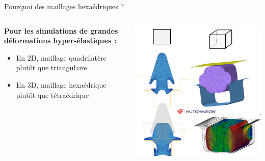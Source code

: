 \begin{frame}{Pourquoi des maillages hexaédriques ?}
    \begin{columns}[T] %
        \begin{column}{.4\textwidth}
            \textbf{Pour les simulations de grandes déformations hyper-élastiques :}

            \begin{itemize}
                \item En 2D, maillage quadrilatère plutôt que triangulaire
                \item En 3D, maillage hexaédrique plutôt que tétraédrique
            \end{itemize}
        \end{column}%
        
        \begin{column}{.6\textwidth}
            \includegraphics[width=1.\linewidth]{img/new_images/simu_hutchinson_2d3d.png}
        \end{column}
    \end{columns}
\end{frame}

